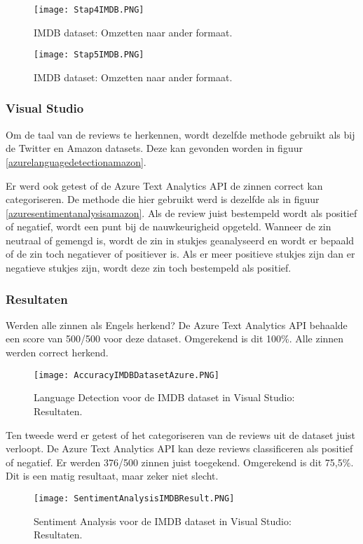 \begin{figure}[!htbp]
    \texttt{[image: Stap4IMDB.PNG]}
    \caption{\label{stap4imdb}IMDB dataset: Omzetten naar ander formaat.}
\end{figure}
\FloatBarrier

\begin{figure}[!htbp]
    \texttt{[image: Stap5IMDB.PNG]}
    \caption{\label{stap5imdb}IMDB dataset: Omzetten naar ander formaat.}
\end{figure}
\FloatBarrier



\subsubsection{Visual Studio}
\label{imdbdatasetvisualstudioazure}
Om de taal van de reviews te herkennen, wordt dezelfde methode gebruikt als bij de Twitter en Amazon datasets. Deze kan gevonden worden in figuur \ref{azurelanguagedetectionamazon}.

Er werd ook getest of de Azure Text Analytics API de zinnen correct kan categoriseren. De methode die hier gebruikt werd is dezelfde als in figuur \ref{azuresentimentanalysisamazon}. Als de review juist bestempeld wordt als positief of negatief, wordt een punt bij de nauwkeurigheid opgeteld. Wanneer de zin neutraal of gemengd is, wordt de zin in stukjes geanalyseerd en wordt er bepaald of de zin toch negatiever of positiever is. Als er meer positieve stukjes zijn dan er negatieve stukjes zijn, wordt deze zin toch bestempeld als positief. 

\subsubsection{Resultaten}
\label{imdbdatasetresultatenazure}
Werden alle zinnen als Engels herkend? De Azure Text Analytics API behaalde een score van 500/500 voor deze dataset. Omgerekend is dit 100\%. Alle zinnen werden correct herkend.

\begin{figure}[!htbp]
    \texttt{[image: AccuracyIMDBDatasetAzure.PNG]}
    \caption{\label{azurelanguagedetectionimdbresults}Language Detection voor de IMDB dataset in Visual Studio: Resultaten.}
\end{figure}
\FloatBarrier 

Ten tweede werd er getest of het categoriseren van de reviews uit de dataset juist verloopt. De Azure Text Analytics API kan deze reviews classificeren als positief of negatief. Er werden 376/500 zinnen juist toegekend. Omgerekend is dit 75,5\%. Dit is een matig resultaat, maar zeker niet slecht. 
\begin{figure}[!htbp]
    \texttt{[image: SentimentAnalysisIMDBResult.PNG]}
    \caption{\label{azuresentimentanalysisimdbresults}Sentiment Analysis voor de IMDB dataset in Visual Studio: Resultaten.}
\end{figure}
\FloatBarrier 




